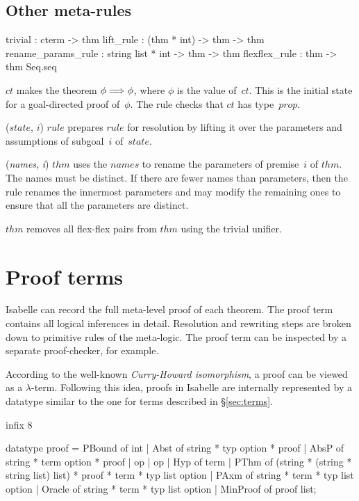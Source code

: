 \subsection{Other meta-rules}
\begin{ttbox} 
trivial            : cterm -> thm
lift_rule          : (thm * int) -> thm -> thm
rename_params_rule : string list * int -> thm -> thm
flexflex_rule      : thm -> thm Seq.seq
\end{ttbox}
\begin{ttdescription}
\item[\ttindexbold{trivial} $ct$] 
makes the theorem \(\phi\Longrightarrow\phi\), where $\phi$ is the value of~$ct$.
This is the initial state for a goal-directed proof of~$\phi$.  The rule
checks that $ct$ has type~$prop$.

\item[\ttindexbold{lift_rule} ($state$, $i$) $rule$] 
prepares $rule$ for resolution by lifting it over the parameters and
assumptions of subgoal~$i$ of~$state$.

\item[\ttindexbold{rename_params_rule} ({\it names}, {\it i}) $thm$] 
uses the $names$ to rename the parameters of premise~$i$ of $thm$.  The
names must be distinct.  If there are fewer names than parameters, then the
rule renames the innermost parameters and may modify the remaining ones to
ensure that all the parameters are distinct.

\item[\ttindexbold{flexflex_rule} $thm$]  
removes all flex-flex pairs from $thm$ using the trivial unifier.
\end{ttdescription}


\section{Proof terms}\label{sec:proofObjects}
 Isabelle can record the full meta-level proof of each
theorem.  The proof term contains all logical inferences in detail.
Resolution and rewriting steps are broken down to primitive rules of the
meta-logic. The proof term can be inspected by a separate proof-checker,
for example.

According to the well-known {\em Curry-Howard isomorphism}, a proof can
be viewed as a $\lambda$-term. Following this idea, proofs
in Isabelle are internally represented by a datatype similar to the one for
terms described in \S\ref{sec:terms}.
\begin{ttbox}
infix 8 %

datatype proof =
   PBound of int
 | Abst of string * typ option * proof
 | AbsP of string * term option * proof
 | op %
 | op %
 | Hyp of term
 | PThm of (string * (string * string list) list) *
           proof * term * typ list option
 | PAxm of string * term * typ list option
 | Oracle of string * term * typ list option
 | MinProof of proof list;
\end{ttbox}

